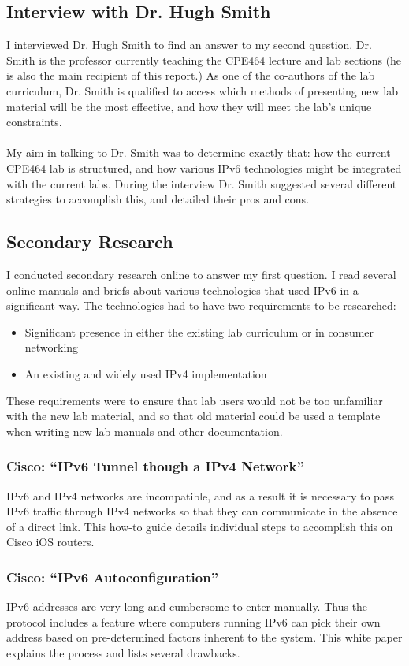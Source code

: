 \documentclass[12pt]{article}
\begin{document}
\subsection{Interview with Dr. Hugh Smith}
I interviewed Dr. Hugh Smith to find an answer to my second question. Dr. Smith is the professor currently teaching the CPE464 lecture and lab sections (he is also the main recipient of this report.) As one of the co-authors of the lab curriculum, Dr. Smith is qualified to access which methods of presenting new lab material will be the most effective, and how they will meet the lab's unique constraints.\\\\
 My aim in talking to Dr. Smith was to determine exactly that: how the current CPE464 lab is structured, and how various IPv6 technologies might be integrated with the current labs. During the interview Dr. Smith suggested several different strategies to accomplish this, and detailed their pros and cons.

\subsection{Secondary Research}
I conducted secondary research online to answer my first question. I read several online manuals and briefs about various technologies that used IPv6 in a significant way. The technologies had to have two requirements to be researched:
\begin{itemize}
\item Significant presence in either the existing lab curriculum or in consumer networking
\item An existing and widely used IPv4 implementation
\end{itemize}
These requirements were to ensure that lab users would not be too unfamiliar with the new lab material, and so that old material could be used a template when writing new lab manuals and other documentation.

\subsubsection{Cisco: ``IPv6 Tunnel though a IPv4 Network''}
IPv6 and IPv4 networks are incompatible, and as a result it is necessary to pass IPv6 traffic through IPv4 networks so that they can communicate in the absence of a direct link. This how-to guide details individual steps to accomplish this on Cisco iOS routers.

\subsubsection{Cisco: ``IPv6 Autoconfiguration''}
IPv6 addresses are very long and cumbersome to enter manually. Thus the protocol includes a feature where computers running IPv6 can pick their own address based on pre-determined factors inherent to the system. This white paper explains the process and lists several drawbacks.
\end{document}
